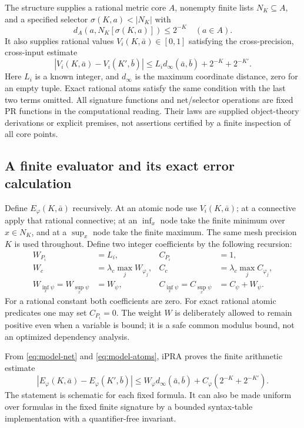 The structure supplies a rational metric core $A$, nonempty finite lists
$N_K\subseteq A$, and a specified selector $\sigma(K,a)<|N_K|$ with
\begin{equation}
 d_A(a,N_K[\sigma(K,a)])\leq 2^{-K}
 \quad(a\in A).
 \label{eq:model-net}
\end{equation}
It also supplies rational values $V_i(K,\bar a)\in[0,1]$ satisfying the
cross-precision, cross-input estimate
\begin{equation}
 |V_i(K,\bar a)-V_i(K',\bar b)|
 \leq L_i d_\infty(\bar a,\bar b)+2^{-K}+2^{-K'}.
 \label{eq:model-atoms}
\end{equation}
Here $L_i$ is a known integer, and $d_\infty$ is the maximum coordinate
distance, zero for an empty tuple. Exact rational atoms satisfy the same
condition with the last two terms omitted. All signature functions and
net/selector operations are fixed PR functions in the computational reading.
Their laws are supplied object-theory derivations or explicit premises, not
assertions certified by a finite inspection of all core points.

\subsection{A finite evaluator and its exact error calculation}

Define $E_\varphi(K,\bar a)$ recursively. At an atomic node use
$V_i(K,\bar a)$; at a connective apply that rational connective; at an
$\inf_x$ node take the finite minimum over $x\in N_K$, and at a $\sup_x$
node take the finite maximum. The same mesh precision $K$ is used throughout.
Define two integer coefficients by the following recursion:
\begin{align*}
 W_{P_i}&=L_i, & C_{P_i}&=1,\\
 W_c&=\lambda_c\max_j W_{\varphi_j},
 &C_c&=\lambda_c\max_j C_{\varphi_j},\\
 W_{\inf_x\psi}=W_{\sup_x\psi}&=W_\psi,
 &C_{\inf_x\psi}=C_{\sup_x\psi}&=C_\psi+W_\psi.
\end{align*}
For a rational constant both coefficients are zero. For exact rational atomic
predicates one may set $C_{P_i}=0$. The weight $W$ is deliberately allowed to
remain positive even when a variable is bound; it is a safe common modulus
bound, not an optimized dependency analysis.

\begin{theorem}
\label{thm:model-comparison}
From \eqref{eq:model-net} and \eqref{eq:model-atoms}, iPRA proves the
finite arithmetic estimate
\begin{equation}
 |E_\varphi(K,\bar a)-E_\varphi(K',\bar b)|
 \leq W_\varphi d_\infty(\bar a,\bar b)
       +C_\varphi(2^{-K}+2^{-K'}).
 \label{eq:model-comparison}
\end{equation}
The statement is schematic for each fixed formula. It can also be made
uniform over formulas in the fixed finite signature by a bounded
syntax-table implementation with a quantifier-free invariant.
\end{theorem}

